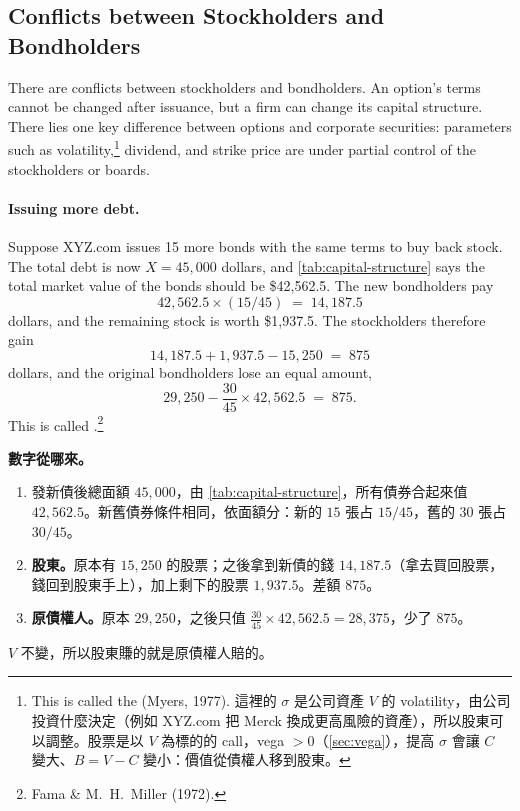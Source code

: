 \subsection{Conflicts between Stockholders and Bondholders}
\label{sec:claim-dilution}


There are conflicts between stockholders and bondholders.
An option's terms cannot be changed after issuance, but a firm can change its capital structure.
There lies one key difference between options and corporate securities: parameters such as volatility,\footnote{This is called the  (Myers, 1977). 這裡的 $\sigma$ 是公司資產 $V$ 的 volatility，由公司投資什麼決定（例如 XYZ.com 把 Merck 換成更高風險的資產），所以股東可以調整。股票是以 $V$ 為標的的 call，vega $>0$（\autoref{sec:vega}），提高 $\sigma$ 會讓 $C$ 變大、$B=V-C$ 變小：價值從債權人移到股東。} dividend, and strike price are under partial control of the stockholders or boards.

\suppstart
{}
\suppend

\paragraph{Issuing more debt.}
Suppose XYZ.com issues 15 more bonds with the same terms to buy back stock.
The total debt is now $X=45{,}000$ dollars, and \autoref{tab:capital-structure} says the total market value of the bonds should be \$42,562.5.
The new bondholders pay
\[
	42{,}562.5\times(15/45) \;=\; 14{,}187.5
\]
dollars, and the remaining stock is worth \$1,937.5.
The stockholders therefore gain
\[
	14{,}187.5+1{,}937.5-15{,}250 \;=\; 875
\]
dollars, and the original bondholders lose an equal amount,
\[
	29{,}250-\frac{30}{45}\times42{,}562.5 \;=\; 875 .
\]
This is called .\footnote{Fama \& M.~H.~Miller (1972).}

\suppstart
{}

\begin{remark}
	\textbf{數字從哪來。}
	\begin{enumerate}[(1),nosep]
		\item 發新債後總面額 $45{,}000$，由 \autoref{tab:capital-structure}，所有債券合起來值 $42{,}562.5$。新舊債券條件相同，依面額分：新的 $15$ 張占 $15/45$，舊的 $30$ 張占 $30/45$。
		\item \textbf{股東。}原本有 $15{,}250$ 的股票；之後拿到新債的錢 $14{,}187.5$（拿去買回股票，錢回到股東手上），加上剩下的股票 $1{,}937.5$。差額 $875$。
		\item \textbf{原債權人。}原本 $29{,}250$，之後只值 $\frac{30}{45}\times42{,}562.5=28{,}375$，少了 $875$。
	\end{enumerate}
	$V$ 不變，所以股東賺的就是原債權人賠的。
\end{remark}

